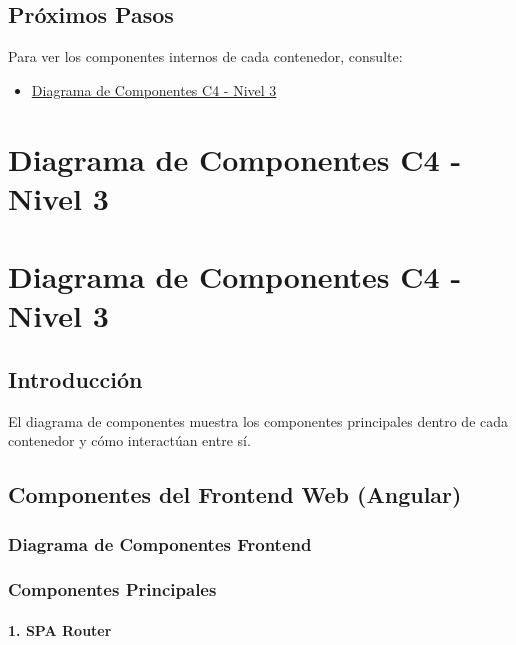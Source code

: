 \documentclass[
  spanish,
  11pt,
  letterpaper,
]{book}
\providecommand{\tightlist}{%
  \setlength{\itemsep}{0pt}\setlength{\parskip}{0pt}}
\begin{document}
\section{Próximos Pasos}\label{pruxf3ximos-pasos-2}

Para ver los componentes internos de cada contenedor, consulte:

\begin{itemize}
\tightlist
\item
  \href{c4-components.qmd}{Diagrama de Componentes C4 - Nivel 3}
\end{itemize}

\chapter{Diagrama de Componentes C4 - Nivel
3}\label{diagrama-de-componentes-c4---nivel-3}

\chapter{Diagrama de Componentes C4 - Nivel
3}\label{diagrama-de-componentes-c4---nivel-3-1}

\section{Introducción}\label{introducciuxf3n-3}

El diagrama de componentes muestra los componentes principales dentro de
cada contenedor y cómo interactúan entre sí.

\section{Componentes del Frontend Web
(Angular)}\label{componentes-del-frontend-web-angular}

\subsection{Diagrama de Componentes
Frontend}\label{diagrama-de-componentes-frontend}

\subsection{Componentes Principales}\label{componentes-principales}

\subsubsection{1. SPA Router}\label{spa-router}
\end{document}
